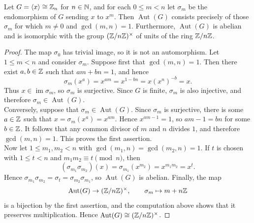\documentclass[../Odyssey_Project.tex]{subfiles}
\begin{document}
\begin{proposition}
\label{prop:2.1}
Let $G = \langle x \rangle \cong \mathbb{Z}_n$ for $n \in \mathbb{N}$, and for each $0 \leq m < n$ let $\sigma_m$ be the endomorphism of $G$ sending $x$ to $x^m$. Then $\operatorname{Aut}(G)$ consists precisely of those $\sigma_m$ for which $m \neq 0$ and $\gcd(m,n) = 1$. Furthermore, $\operatorname{Aut}(G)$ is abelian and is isomorphic with the group $(\mathbb{Z}/n\mathbb{Z})^{\times}$ of units of the ring $\mathbb{Z}/n\mathbb{Z}$.
\end{proposition}
\begin{proof}
    The map $\sigma_0$ has trivial image, so it is not an automorphism. Let $1 \leq m < n$ and consider $\sigma_m$. Suppose first that $\gcd(m,n) = 1$. Then there exist $a,b \in \mathbb{Z}$ such that $am + bn = 1$, and hence
    \[
        \sigma_m(x^a) = x^{am} = x^{1 - bn} = x(x^n)^{-b} = x.
    \]
    Thus $x \in \operatorname{im}\sigma_m$, so $\sigma_m$ is surjective. Since $G$ is finite, $\sigma_m$ is also injective, and therefore $\sigma_m \in \operatorname{Aut}(G)$. \\
    Conversely, suppose that $\sigma_m \in \operatorname{Aut}(G)$. Since $\sigma_m$ is surjective, there is some $a \in \mathbb{Z}$ such that $x = \sigma_m(x^a) = x^{am}$. Hence $x^{am - 1} = 1$, so $am - 1 = bn$ for some $b \in \mathbb{Z}$. It follows that any common divisor of $m$ and $n$ divides $1$, and therefore $\gcd(m,n) = 1$. This proves the first assertion. \\
    Now let $1 \leq m_1,m_2 < n$ with $\gcd(m_1,n) = \gcd(m_2,n) = 1$. If $t$ is chosen with $1 \leq t < n$ and $m_1m_2 \equiv t \pmod{n}$, then
    \[
        (\sigma_{m_1}\sigma_{m_2})(x) = \sigma_{m_1}(x^{m_2}) = x^{m_1m_2} = x^t.
    \]
    Hence $\sigma_{m_1}\sigma_{m_2} = \sigma_t = \sigma_{m_2}\sigma_{m_1}$, so $\operatorname{Aut}(G)$ is abelian. Finally, the map
    \[
        \operatorname{Aut}(G) \to (\mathbb{Z}/n\mathbb{Z})^{\times}, \qquad \sigma_m \mapsto m + n\mathbb{Z}
    \]
    is a bijection by the first assertion, and the computation above shows that it preserves multiplication. Hence $\operatorname{Aut}(G) \cong (\mathbb{Z}/n\mathbb{Z})^{\times}$.
\end{proof}
\end{document}
